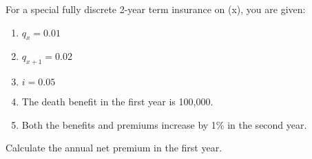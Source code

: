For a special fully discrete 2-year term insurance on (x), you are given:
\begin{enumerate}
\item $q_x=0.01$
\item $q_{x+1}  = 0.02$
\item $i=0.05$
\item The death benefit in the first year is 100,000.
\item Both the benefits and premiums increase by 1\% in the second year.
\end{enumerate}
Calculate the annual net premium in the first year.

